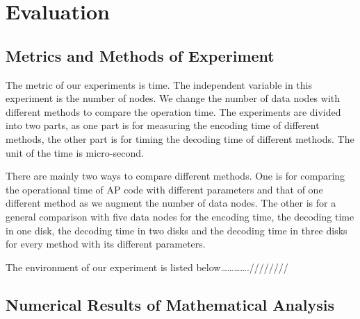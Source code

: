\section{Evaluation}
\subsection{Metrics and Methods of Experiment}
The metric of our experiments is time. The independent variable in this experiment is the number of nodes. We change the number of data nodes with different methods to compare the operation time. The experiments are divided into two parts, as one part is for measuring the encoding time of different methods, the other part is for timing the decoding time of different methods. The unit of the time is micro-second.\par

There are mainly two ways to compare different methods. One is for comparing the operational time of AP code with different parameters and that of one different method as we augment the number of data nodes. The other is for a general comparison with five data nodes for the encoding time, the decoding time in one disk, the decoding time in two disks and the decoding time in three disks for every method with its different parameters.\par

The environment of our experiment is listed below………….////////\par


\subsection{Numerical Results of Mathematical Analysis}
